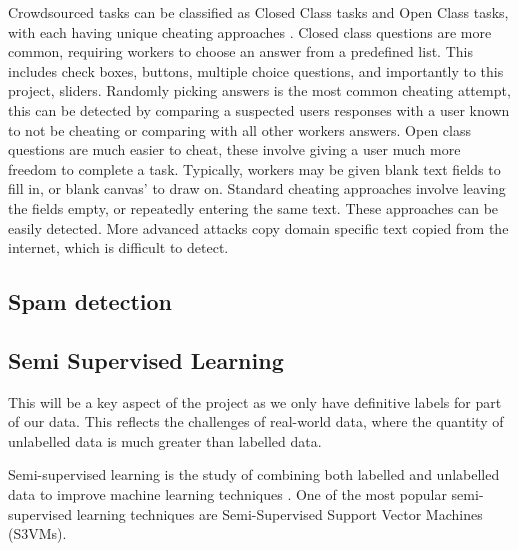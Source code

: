 \documentclass{article}
\begin{document}
Crowdsourced tasks can be classified as Closed Class tasks and Open Class tasks, with each having unique cheating approaches \cite{eickhoff2013increasing}.
Closed class questions are more common, requiring workers to choose an answer from a predefined list.
This includes check boxes, buttons, multiple choice questions, and importantly to this project, sliders.
Randomly picking answers is the most common cheating attempt, this can be detected by comparing a suspected users responses with a user known to not be cheating or comparing with all other workers answers.
Open class questions are much easier to cheat, these involve giving a user much more freedom to complete a task.
Typically, workers may be given blank text fields to fill in, or blank canvas' to draw on.
Standard cheating approaches involve leaving the fields empty, or repeatedly entering the same text.
These approaches can be easily detected.
More advanced attacks copy domain specific text copied from the internet, which is difficult to detect. 

\subsection{Spam detection}


\subsection{Semi Supervised Learning}
This will be a key aspect of the project as we only have definitive labels for part of our data.
This reflects the challenges of real-world data, where the quantity of unlabelled data is much greater than labelled data.

Semi-supervised learning is the study of combining both labelled and unlabelled data to improve machine learning techniques \cite{zhu2009introduction}.
One of the most popular semi-supervised learning techniques are Semi-Supervised Support Vector Machines (S3VMs).

\end{document}
